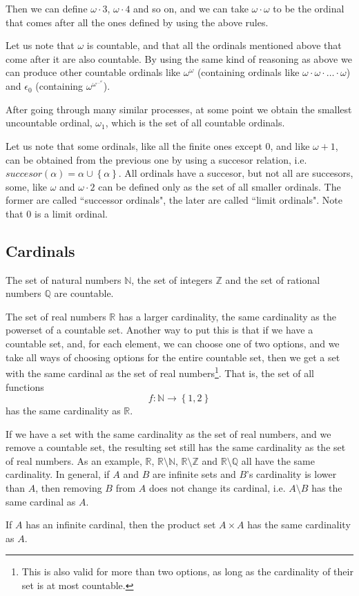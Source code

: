 \documentclass[a4paper
,draft
]{article}
\def\reale{\mathbb{R}}
\def\intregi{\mathbb{Z}}
\def\naturale{\mathbb{N}}
\def\rationale{\mathbb{Q}}
\newcommand{\multime}[1]{\left\{ #1 \right\}}
\newcommand{\ghilimele}[1]{``#1"}
\begin{document}
Then we can define $\omega\cdot 3$, $\omega\cdot 4$ and so on, and we can
take $\omega\cdot \omega$ to be the ordinal that comes after all the ones
defined by using the above rules.

Let us note that $\omega$ is countable, and that all the ordinals mentioned
above that come after it are also countable.
By using the same kind of
reasoning as above we can produce other countable ordinals like
$\omega^\omega$ (containing ordinals like $\omega\cdot\omega\cdot\dots\cdot\omega$)
and $\epsilon_0$ (containing $\omega^{\omega^{\cdots^\omega}}$).

After going through many similar processes, at some point we obtain the
smallest uncountable ordinal, $\omega_1$, which is the set of all
countable ordinals.

Let us note that some ordinals, like all the finite ones except $0$,
and like $\omega+1$, can be obtained from the previous one by using
a succesor relation, i.e. $succesor(\alpha) = \alpha\cup\multime{\alpha}$.
All ordinals have a succesor, but not all are succesors, some, like
$\omega$ and $\omega\cdot 2$ can be defined only as the set of all
smaller ordinals. The former are called \ghilimele{successor ordinals},
the later are called \ghilimele{limit ordinals}. Note that $0$ is a limit
ordinal.

\subsection{Cardinals}
\label{sec:cardinals}

The set of natural numbers $\naturale$, the set of integers $\intregi$ and
the set of rational numbers $\rationale$ are countable.

The set of real numbers $\reale$ has a larger cardinality, the same cardinality
as the powerset of a countable set. Another way to put this is that
if we have a countable set, and, for each element, we can choose one of two
options,
and we take all ways of choosing options for the entire countable set,
then we get a set with the same cardinal as the set of real numbers\footnote{
    This is also valid for more than two options, as long as the cardinality
    of their set is at most countable.
  }.
That is, the set of all functions
$$
f : \naturale \longrightarrow \multime{1, 2}
$$
has the same cardinality as $\reale$.

If we have a set with the same cardinality as the set of real numbers, and
we remove a countable set, the resulting set still has the same cardinality
as the set of real numbers. As an example, $\reale$, $\reale\setminus\naturale$,
$\reale\setminus\intregi$ and $\reale\setminus\rationale$ all have the same
cardinality. In general, if $A$ and $B$ are infinite sets and
$B$'s cardinality is lower than $A$, then removing $B$ from $A$ does not change
its cardinal, i.e. $A\setminus B$ has the same cardinal as $A$.

If $A$ has an infinite cardinal, then the product set $A\times A$ has the same
cardinality as $A$.

\printbibliography
\end{document}
